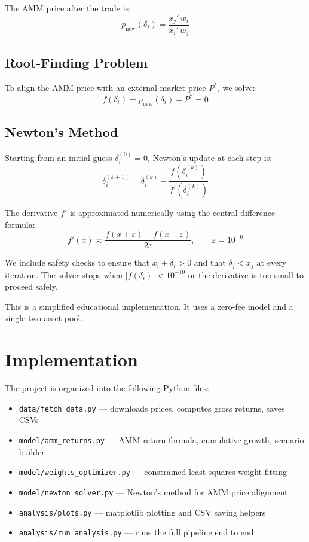 \documentclass[12pt]{article}
\begin{document}
The AMM price after the trade is:
\[
p_{\text{new}}(\delta_i) = \frac{x_j' \, w_i}{x_i' \, w_j}
\]

\subsection*{Root-Finding Problem}

To align the AMM price with an external market price $P^*$, we solve:
\[
f(\delta_i) = p_{\text{new}}(\delta_i) - P^* = 0
\]

\subsection*{Newton's Method}

Starting from an initial guess $\delta_i^{(0)} = 0$, Newton's update at each step is:
\[
\delta_i^{(k+1)} = \delta_i^{(k)} - \frac{f\!\left(\delta_i^{(k)}\right)}{f'\!\left(\delta_i^{(k)}\right)}
\]

The derivative $f'$ is approximated numerically using the central-difference formula:
\[
f'(x) \approx \frac{f(x + \varepsilon) - f(x - \varepsilon)}{2\varepsilon}, \qquad \varepsilon = 10^{-6}
\]

We include safety checks to ensure that $x_i + \delta_i > 0$ and that $\delta_j < x_j$ at every iteration. The solver stops when $|f(\delta_i)| < 10^{-10}$ or the derivative is too small to proceed safely.

This is a simplified educational implementation. It uses a zero-fee model and a single two-asset pool.

\section{Implementation}

The project is organized into the following Python files:

\begin{itemize}
    \item \texttt{data/fetch\_data.py} — downloads prices, computes gross returns, saves CSVs
    \item \texttt{model/amm\_returns.py} — AMM return formula, cumulative growth, scenario builder
    \item \texttt{model/weights\_optimizer.py} — constrained least-squares weight fitting
    \item \texttt{model/newton\_solver.py} — Newton's method for AMM price alignment
    \item \texttt{analysis/plots.py} — matplotlib plotting and CSV saving helpers
    \item \texttt{analysis/run\_analysis.py} — runs the full pipeline end to end
\end{itemize}
\end{document}
